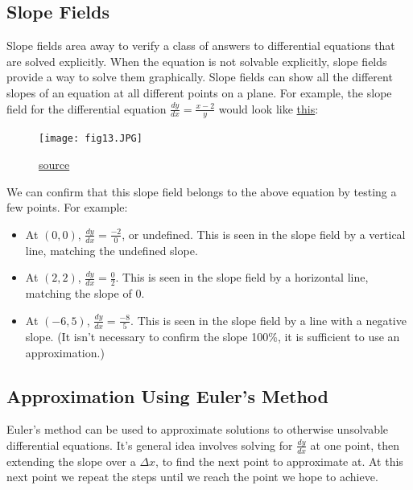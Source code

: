 \documentclass[12pt]{article}
\begin{document}
\subsection{Slope Fields}
Slope fields area away to verify a class of answers to differential equations that are solved explicitly. When the equation is not solvable explicitly, slope fields provide a way to solve them graphically. Slope fields can show all the different slopes of an equation at all different points on a plane. For example, the slope field for the differential equation $\frac{dy}{dx} = \frac{x-2}{y}$ would look like \hyperref[fig:slopefield1]{this}:

\begin{figure}[H]
    \begin{center}
        \texttt{[image: fig13.JPG]}
        \caption{\href{https://www.khanacademy.org/math/ap-calculus-bc/bc-differential-equations-new}{source}}
        \label{fig:slopefield1}
    \end{center}
\end{figure}

We can confirm that this slope field belongs to the above equation by testing a few points. For example:
\begin{itemize}
    \item At $(0, 0)$, $\frac{dy}{dx} = \frac{-2}{0}$, or undefined. This is seen in the slope field by a vertical line, matching the undefined slope.
    \item At $(2, 2)$, $\frac{dy}{dx} = \frac{0}{2}$. This is seen in the slope field by a horizontal line, matching the slope of $0$.
    \item At $(-6, 5)$, $\frac{dy}{dx} = \frac{-8}{5}$. This is seen in the slope field by a line with a negative slope. (It isn't necessary to confirm the slope 100\%, it is sufficient to use an approximation.)
\end{itemize}

\subsection{Approximation Using Euler's Method}
Euler's method can be used to approximate solutions to otherwise unsolvable differential equations. It's general idea involves solving for $\frac{dy}{dx}$ at one point, then extending the slope over a $\Delta x$, to find the next point to approximate at. At this next point we repeat the steps until we reach the point we hope to achieve.
\end{document}
